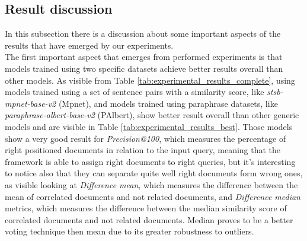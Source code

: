 \documentclass[\main/main.tex]{subfiles}
\begin{document}
\subsection{Result discussion}
In this subsection there is a discussion about some important aspects of the results that have emerged by our experiments. \\
The first important aspect that emerges from performed experiments is that models trained using two specific datasets achieve better results overall than other models. As visible from Table \ref{tab:experimental_results_complete}, using models trained using a set of sentence pairs with a similarity score, like \emph{stsb-mpnet-base-v2} (Mpnet), and models trained using paraphrase datasets, like \emph{paraphrase-albert-base-v2} (PAlbert), show better result overall than other generic models and are visible in Table \ref{tab:experimental_results_best}. Those models show a very good result for \emph{Precision@100}, which measures the percentage of right positioned documents in relation to the input query, meaning that the framework is able to assign right documents to right queries, but it's interesting to notice also that they can separate quite well right documents form wrong ones, as visible looking at \emph{Difference mean}, which measures the difference between the mean of correlated documents and not related documents, and \emph{Difference median} metrics, which measures the difference between the median similarity score of correlated documents and not related documents. Median proves to be a better voting technique then mean due to its greater robustness to outliers.
\begin{table}[H]
\centering
{}
\caption{Best results table}
\label{tab:experimental_results_best}
\end{table}
\end{document}
